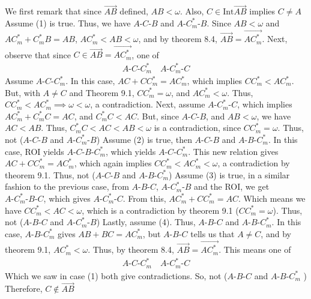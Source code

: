 \documentclass{report}
\begin{document}
    We first remark that since $\overrightarrow{AB}  $ defined, $AB < \omega$. Also, $C \in \text{Int}\overrightarrow{AB}  $ implies $C \ne A $
    \bigbreak \noindent 
    Assume (1) is true. Thus, we have $ A\text{-}C\text{-}B$ and $  A\text{-}C_{m}^{*}\text{-}B$. Since $ AB < \omega$ and $ AC_{m}^{*} + C_{m}^{*}B = AB$, $AC_{m}^{*} < AB < \omega$, and by theorem 8.4, $\overrightarrow{AB} = \overrightarrow{AC_{m}^{*}} $. Next, observe that since $C \in \overrightarrow{AB} = \overrightarrow{AC_{m}^{*}} $, one of
    \begin{align*}
        A\text{-}C\text{-}C_{m}^{*} \quad A\text{-}C_{m}^{*}\text{-}C
    \end{align*}
    Assume $ A\text{-}C\text{-}C_{m}^{*}$. In this case, $AC + CC_{m}^{*} = AC_{m}^{*}$, which implies $CC_{m}^{*} < AC_{m}^{*}$. But, with $A \ne C$ and Theorem 9.1, $CC_{m}^{*} = \omega$, and $AC_{m}^{*} < \omega$. Thus, $CC_{m}^{*} < AC_{m}^{*} \implies \omega < \omega$, a contradiction.
    \bigbreak \noindent 
    Next, assume $ A\text{-}C_{m}^{*}\text{-}C$, which implies $ AC_{m}^{*} + C_{m}^{*}C = AC$, and $C_{m}^{*}C < AC$. But, since $ A\text{-}C\text{-}B$, and $AB < \omega$, we have $AC < AB$. Thus, $C_{m}^{*}C < AC < AB < \omega$ is a contradiction, since $CC_{m}^{*} = \omega $. Thus, not ($ A\text{-}C\text{-}B$ and $ A\text{-}C_{m}^{*}\text{-}B $)
    \bigbreak \noindent 
    Assume (2) is true, then $ A\text{-}C\text{-}B$ and $ A\text{-}B\text{-}C_{m}^{*}$. In this case, ROI yields $ A\text{-}C\text{-}B\text{-}C_{m}^{*}$, which yields $ A\text{-}C\text{-}C_{m}^{*}$. This new relation gives $AC + CC_{m}^{*} = AC_{m}^{*}$, which again implies $CC_{m}^{*} < AC_{m}^{*} < \omega$, a contradiction by theorem 9.1. Thus, not ($ A\text{-}C\text{-}B$ and $A\text{-}B\text{-}C_{m}^{*}$)
    \bigbreak \noindent 
    Assume (3) is true, in a similar fashion to the previous case, from $ A\text{-}B\text{-}C$, $ A\text{-}C_{m}^{*}\text{-}B$ and the ROI, we get $ A\text{-}C_{m}^{*}\text{-}B\text{-}C $, which gives $ A\text{-}C_{m}^{*}\text{-}C$. From this, $AC_{m}^{*} +CC_{m}^{*} = AC$. Which means we have $ CC_{m}^{*} < AC < \omega$, which is a contradiction by theorem 9.1 ($CC_{m}^{*} = \omega$). Thus, not ($ A\text{-}B\text{-}C $ and $ A\text{-}C_{m}^{*}\text{-}B $)
    \bigbreak \noindent 
    Lastly, assume (4). Thus, $ A\text{-}B\text{-}C$ and $ A\text{-}B\text{-}C_{m}^{*}$. In this case, $ A\text{-}B\text{-}C_{m}^{*} $ gives $ AB + BC = AC_{m}^{*} $, but $ A\text{-}B\text{-}C$ tells us that $A \ne C$, and by theorem 9.1, $AC_{m}^{*} < \omega$. Thus, by theorem 8.4, $\overrightarrow{AB} = \overrightarrow{AC_{m}^{*}}$. This means one of 
    \begin{align*}
        A\text{-}C\text{-}C_{m}^{*} \quad A\text{-}C_{m}^{*}\text{-}C
    \end{align*}
    Which we saw in case (1) both give contradictions. So, not ($ A\text{-}B\text{-}C$ and $ A\text{-}B\text{-}C_{m}^{*}$ )
    \bigbreak \noindent 
    Therefore, $C \not\in \overrightarrow{AB} $ \endpf
\end{document}
